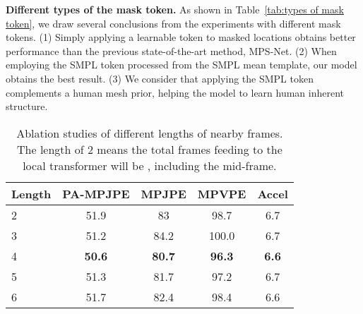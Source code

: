 \documentclass[10pt,twocolumn,letterpaper]{article}
\begin{document}
		\noindent\textbf{Different types of the mask token.}
		As shown in Table~\ref{tab:types of mask token}, we draw several conclusions from the experiments with different mask tokens.
		(1) Simply applying a learnable token to masked locations obtains better performance than the previous state-of-the-art method, MPS-Net. 
		(2) When employing the SMPL token processed from the SMPL mean template, our model obtains the best result. 
		(3) We consider that applying the SMPL token complements a human mesh prior, helping the model to learn human inherent structure.
		
		\begin{table}[t]
			\small
			\setlength{\tabcolsep}{7 pt}


			
			\begin{center}
				\begin{tabular}{l | c c c c}
					\toprule[2pt]
					Length & PA-MPJPE & MPJPE & MPVPE & Accel \\
					\midrule[1pt]
					2 & 51.9 & 83 &	98.7 & 6.7 \\
					
					\cellcolor{Gray}3 &	\cellcolor{Gray}51.2 &	\cellcolor{Gray}84.2 & 	\cellcolor{Gray}100.0 &	\cellcolor{Gray}6.7 \\
					
					4 & \textbf{50.6} & \textbf{80.7} &  \textbf{96.3} &  \textbf{6.6} \\
					
					\cellcolor{Gray}5 & 	\cellcolor{Gray}51.3 & 	\cellcolor{Gray}81.7 &  	\cellcolor{Gray}97.2 &  	\cellcolor{Gray}6.7 \\
					
					6 & 51.7 & 82.4 &  98.4 &  6.6 \\
					\bottomrule[1pt]
				\end{tabular}
			\end{center}
			\vspace{-1.5 em}
			\caption{Ablation studies of different lengths of nearby frames. The length of 2 means the total frames feeding to the local transformer will be , including the mid-frame.}
\label{tab:nearby}
		\end{table}
		
\end{document}
